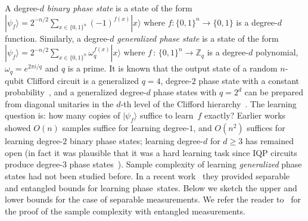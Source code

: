 \documentclass[11pt]{article}
\def\01{\{0,1\}}
\def\01{\{0,1\}}
\newcommand{\ket}[1]{|#1\rangle}
\newcommand{\ZZ}{\mathbb{Z}}
\begin{document}
A degree-$d$ \emph{binary phase state} is a state of the form $\ket{\psi_f}=2^{-n/2}\sum_{x\in \01^n}(-1)^{f(x)}\ket{x}$ where $f:\01^n\rightarrow \01$ is a degree-$d$ function. Similarly, a degree-$d$ \emph{generalized phase state} is a state of the form   $\ket{\psi_f}=2^{-n/2}\sum_{x\in \01^n}\omega_q^{f(x)}\ket{x}$ where $f\, : \, \{0,1\}^n\to \ZZ_q$ is a degree-$d$ polynomial, $\omega_q=e^{2 \pi i/q}$ and $q$ is a prime. It is known that the output state of a random $n$-qubit Clifford circuit is a generalized $q=4$, degree-$2$ phase state with a constant probability~\cite{bravyi2016improved}, and 
a generalized degree-$d$ phase states with $q=2^d$ can be prepared from diagonal unitaries in the $d$-th level of the Clifford hierarchy~\cite{gottesman1999demonstrating,cui2017diagonal}. 
The learning question is: how many copies of $\ket{\psi_f}$ suffice to learn~$f$ exactly? Earlier works~\cite{bernstein1997quantum,montanaro2017learning,rotteler2009quantum}  showed $O(n)$ samples suffice for learning degree-$1$, and $O(n^2)$ suffices for learning degree-$2$ binary phase states; learning degree-$d$ for $d\geq 3$ has remained open (in fact it was plausible that it was a hard learning task since IQP circuits produce degree-$3$ phase states~\cite{montanaro2017circuits,bremner2011classical}). Sample complexity of learning \emph{generalized} phase states had not been studied before. 
In a recent work~\cite{DBLP:journals/corr/abs-2208-07851} they provided separable and entangled bounds for learning phase~states. Below we sketch the upper and lower bounds for the case of separable measurements. We refer the reader to~\cite{DBLP:journals/corr/abs-2208-07851} for the proof of the sample complexity with entangled measurements.
\end{document}
